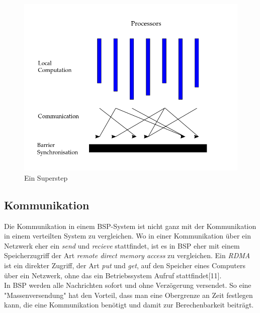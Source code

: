 \documentclass[a4paper,10pt]{scrartcl}
\begin{document}
\begin{figure}[h]
	\centering \includegraphics[scale = 0.4]{superstep.png}
	
	\caption{Ein Superstep}
\end{figure}



\subsection{Kommunikation}
Die Kommunikation in einem BSP-System ist nicht ganz mit der Kommunikation in einem verteilten System zu vergleichen. Wo in einer Kommunikation über ein Netzwerk eher ein \textit{send} und \textit{recieve} stattfindet, ist es in BSP eher mit einem Speicherzugriff der Art \textit{remote direct memory access} zu vergleichen. Ein \textit{RDMA} ist ein direkter Zugriff, der Art \textit{put} und \textit{get}, auf den Speicher eines Computers über ein Netzwerk, ohne das ein Betriebssystem Aufruf stattfindet[11].\\
In BSP werden alle Nachrichten sofort und ohne Verzögerung versendet. So eine "Massenversendung" hat den Vorteil, dass man eine Obergrenze an Zeit festlegen kann, die eine Kommunikation benötigt und damit zur Berechenbarkeit beiträgt. 
\end{document}
